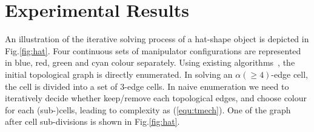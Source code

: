 \documentclass[conference]{IEEEtran}
\begin{document}
\section{Experimental Results}\label{section_experiment}
\label{section_results}



An illustration of the iterative solving process of a hat-shape object is depicted in Fig.\ref{fig:hat}. 
Four continuous sets of manipulator configurations are represented in blue, red, green and cyan colour separately. 
Using existing algorithms~\cite{Yang2020Cellular}, the initial topological graph is directly enumerated. In solving an $\alpha(\geq 4)$-edge cell, the cell is divided into a set of $3$-edge cells. In naive enumeration we need to iteratively decide whether keep/remove each topological edges, and choose colour for each (sub-)cells, leading to complexity as (\ref{equ:tmech}). One of the graph after cell sub-divisions is shown in Fig.\ref{fig:hat}.  
\end{document}
